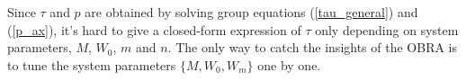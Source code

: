 \documentclass[journal]{IEEEtran}
\begin{document}

Since $\tau$ and $p$ are obtained by solving group equations (\ref{tau_general}) and (\ref{p_ax}), it's hard to give a closed-form expression of $\tau$ only depending on system parameters, $M$, $W_0$, $m$ and $n$.
The only way to catch the insights of the OBRA is to tune the system parameters $\lbrace M, W_0, W_m \rbrace$ one by one.
\end{document}
